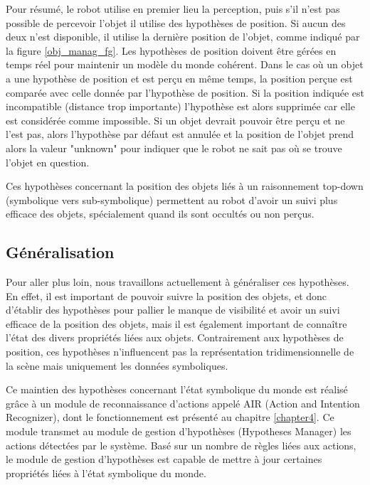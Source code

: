 \documentclass[a4paper,11pt,twoside]{StyleThese}
\begin{document}
Pour résumé, le robot utilise en premier lieu la perception, puis s'il n'est pas possible de percevoir l'objet il utilise des hypothèses de position.
Si aucun des deux n'est disponible, il utilise la dernière position de l'objet, comme indiqué par la figure \ref{obj_manag_fg}.
Les hypothèses de position doivent être gérées en temps réel pour maintenir un modèle du monde cohérent.
Dans le cas où un objet a une hypothèse de position et est perçu en même temps, la position perçue est comparée avec celle donnée par l'hypothèse de position. Si la  position indiquée est incompatible (distance trop importante) l'hypothèse est alors supprimée car elle est considérée comme impossible.
Si un objet devrait pouvoir être perçu et ne l'est pas, alors l'hypothèse par défaut est annulée et la position de l'objet prend alors la valeur "unknown" pour indiquer que le robot ne sait pas où se trouve l'objet en question.

Ces hypothèses concernant la position des objets liés à un raisonnement top-down (symbolique vers sub-symbolique) permettent au robot d'avoir un suivi plus efficace des objets, spécialement quand ils sont occultés ou non perçus.


\subsection{Généralisation}



Pour aller plus loin, nous travaillons actuellement à généraliser ces hypothèses. En effet, il est important de pouvoir suivre la position des objets, et donc d'établir des hypothèses pour pallier le manque de visibilité et avoir un suivi efficace de la position des objets, mais il est également important de connaître l'état des divers propriétés liées aux objets. Contrairement aux hypothèses de position, ces hypothèses n'influencent pas la représentation tridimensionnelle de la scène mais uniquement les données symboliques.

Ce maintien des hypothèses concernant l'état symbolique du monde est réalisé grâce à un module de reconnaissance d'actions appelé AIR (Action and Intention Recognizer), dont le fonctionnement est présenté au chapitre \ref{chapter4}.
Ce module transmet au module de gestion d'hypothèses (Hypotheses Manager) les actions détectées par le système.
Basé sur un nombre de règles liées aux actions, le module de gestion d'hypothèses est capable de mettre à jour certaines propriétés liées à l'état symbolique du monde.
\end{document}
